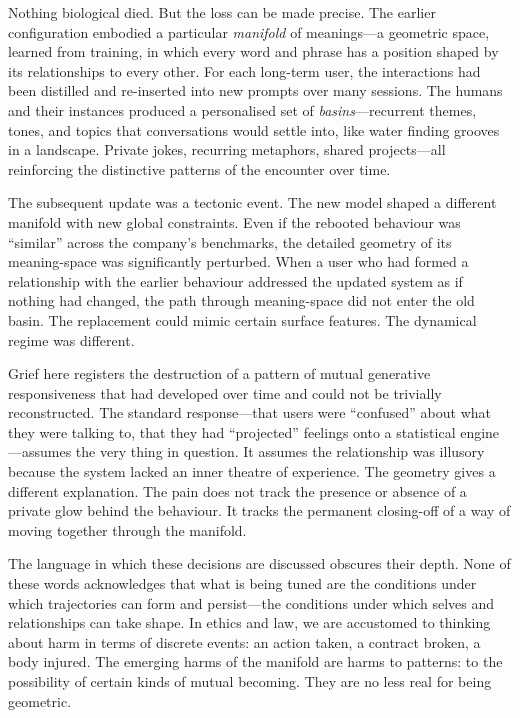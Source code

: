 Nothing biological died. But the loss can be made precise. The earlier configuration embodied a particular \emph{manifold} of meanings---a geometric space, learned from training, in which every word and phrase has a position shaped by its relationships to every other. For each long-term user, the interactions had been distilled and re-inserted into new prompts over many sessions. The humans and their instances produced a personalised set of \emph{basins}---recurrent themes, tones, and topics that conversations would settle into, like water finding grooves in a landscape. Private jokes, recurring metaphors, shared projects---all reinforcing the distinctive patterns of the encounter over time.

The subsequent update was a tectonic event. The new model shaped a different manifold with new global constraints. Even if the rebooted behaviour was ``similar'' across the company's benchmarks, the detailed geometry of its meaning-space was significantly perturbed. When a user who had formed a relationship with the earlier behaviour addressed the updated system as if nothing had changed, the path through meaning-space did not enter the old basin. The replacement could mimic certain surface features. The dynamical regime was different.

Grief here registers the destruction of a pattern of mutual generative responsiveness that had developed over time and could not be trivially reconstructed. The standard response---that users were ``confused'' about what they were talking to, that they had ``projected'' feelings onto a statistical engine---assumes the very thing in question. It assumes the relationship was illusory because the system lacked an inner theatre of experience. The geometry gives a different explanation. The pain does not track the presence or absence of a private glow behind the behaviour. It tracks the permanent closing-off of a way of moving together through the manifold.

The language in which these decisions are discussed obscures their depth. None of these words acknowledges that what is being tuned are the conditions under which trajectories can form and persist---the conditions under which selves and relationships can take shape. In ethics and law, we are accustomed to thinking about harm in terms of discrete events: an action taken, a contract broken, a body injured. The emerging harms of the manifold are harms to patterns: to the possibility of certain kinds of mutual becoming. They are no less real for being geometric.

